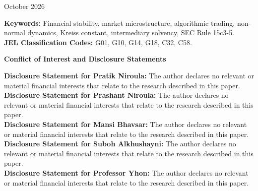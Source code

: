 \documentclass[11pt]{article}
\theoremstyle{remark}
\begin{document}
\begin{titlepage}
\begin{center}
{\normalsize October 2026\par}
\end{center}
\vspace{0.25cm}
\begin{abstract}
\noindent Electronic limit order books with adaptive trading algorithms and endogenous price impact operate as closed-loop dynamical systems. Although standard models equate market stability with eigenvalue stability ($\rho(J)<1$), eigenvalue stability fails to guarantee intermediary solvency under maintenance-margin constraints. Asymmetric price impact, momentum order flow, and limit-book sweep depletion render the transition operator non-normal ($JJ^\top \neq J^\top J$), generating transient price-impact amplification before asymptotic decay begins. Using a unit-invariant physical input-output impulse gain ($\mathcal{G}_{I\to O}$), we show that pre-window transient amplification predicts out-of-sample adverse price excursions ($\Delta R^2 = +10.44\%$) and depth collapses ($\Delta R^2 = +7.45\%$), and we design a cohort-identification-free pre-trade power-norm guard ($\mathcal{G}_{\text{power}}$) that prevents forced liquidations.
\end{abstract}
\vspace{0.25cm}
\noindent\textbf{Keywords:} Financial stability, market microstructure, algorithmic trading, non-normal dynamics, Kreiss constant, intermediary solvency, SEC Rule 15c3-5.\\[0.12cm]
\noindent\textbf{JEL Classification Codes:} G01, G10, G14, G18, C32, C58.

\newpage
\thispagestyle{empty}
\vspace*{0.6cm}
\begin{center}{\Large \textbf{Conflict of Interest and Disclosure Statements}}\end{center}
\vspace{0.35cm}
\noindent\textbf{Disclosure Statement for Pratik Niroula:} The author declares no relevant or material financial interests that relate to the research described in this paper.\\[0.28cm]
\noindent\textbf{Disclosure Statement for Prashant Niroula:} The author declares no relevant or material financial interests that relate to the research described in this paper.\\[0.28cm]
\noindent\textbf{Disclosure Statement for Mansi Bhavsar:} The author declares no relevant or material financial interests that relate to the research described in this paper.\\[0.28cm]
\noindent\textbf{Disclosure Statement for Suboh Alkhushayni:} The author declares no relevant or material financial interests that relate to the research described in this paper.\\[0.28cm]
\noindent\textbf{Disclosure Statement for Professor Yhon:} The author declares no relevant or material financial interests that relate to the research described in this paper.
\end{titlepage}
\end{document}
